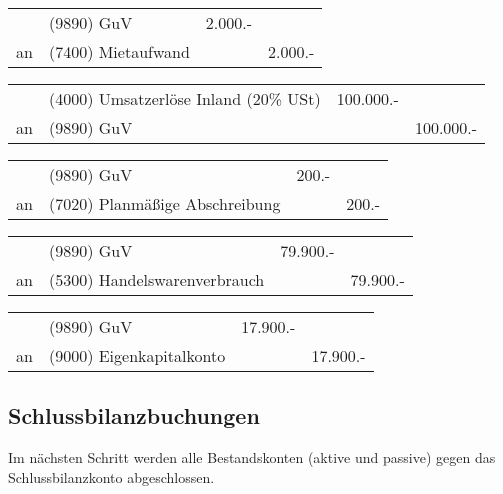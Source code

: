 \documentclass[parskip=half,12pt,a4paper]{scrartcl}
\begin{document}
\begin{center}
\begin{tabularx}{\textwidth}{rXrr}
 \toprule
    & (9890) GuV & 2.000.- &\\
 an & (7400) Mietaufwand & & 2.000.-\\
\bottomrule
\end{tabularx}
\end{center}

\begin{center}
\begin{tabularx}{\textwidth}{rXrr}
 \toprule
    & (4000) Umsatzerlöse Inland (20\% USt) & 100.000.- &\\
 an & (9890) GuV & & 100.000.-\\
\bottomrule
\end{tabularx}
\end{center}

\begin{center}
\begin{tabularx}{\textwidth}{rXrr}
 \toprule
    & (9890) GuV & 200.- &\\
 an & (7020) Planmäßige Abschreibung & & 200.-\\
\bottomrule
\end{tabularx}
\end{center}

\begin{center}
\begin{tabularx}{\textwidth}{rXrr}
 \toprule
    & (9890) GuV & 79.900.- &\\
 an & (5300) Handelswarenverbrauch & & 79.900.-\\
\bottomrule
\end{tabularx}
\end{center}

\begin{center}
\begin{tabularx}{\textwidth}{rXrr}
 \toprule
    & (9890) GuV & 17.900.- &\\
 an & (9000) Eigenkapitalkonto & &17.900.-\\
\bottomrule
\end{tabularx}
\end{center}

\subsection{Schlussbilanzbuchungen}
Im nächsten Schritt werden alle Bestandskonten (aktive und passive) gegen das Schlussbilanzkonto abgeschlossen.
\end{document}
